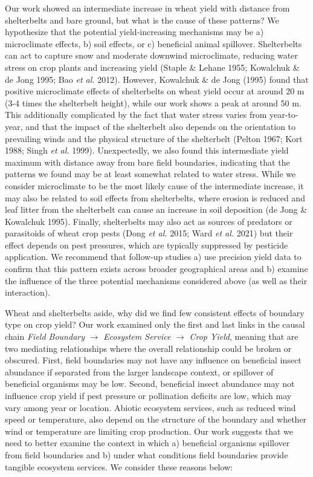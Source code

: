 \documentclass[]{elsarticle} %
\begin{document}
Our work showed an intermediate increase in wheat yield with distance from shelterbelts and bare ground, but what is the cause of these patterns?
We hypothesize that the potential yield-increasing mechanisms may be a) microclimate effects, b) soil effects, or c) beneficial animal spillover.
Shelterbelts can act to capture snow and moderate downwind microclimate, reducing water stress on crop plants and increasing yield (Staple \& Lehane 1955; Kowalchuk \& de Jong 1995; Bao \emph{et al.} 2012).
However, Kowalchuk \& de Jong (1995) found that positive microclimate effects of shelterbelts on wheat yield occur at around 20 m (3-4 times the shelterbelt height), while our work shows a peak at around 50 m.
This additionally complicated by the fact that water stress varies from year-to-year, and that the impact of the shelterbelt also depends on the orientation to prevailing winds and the physical structure of the shelterbelt (Pelton 1967; Kort 1988; Singh \emph{et al.} 1999).
Unexpectedly, we also found this intermediate yield maximum with distance away from bare field boundaries, indicating that the patterns we found may be at least somewhat related to water stress.
While we consider microclimate to be the most likely cause of the intermediate increase, it may also be related to soil effects from shelterbelts, where erosion is reduced and leaf litter from the shelterbelt can cause an increase in soil deposition (de Jong \& Kowalchuk 1995).
Finally, shelterbelts may also act as sources of predators or parasitoids of wheat crop pests (Dong \emph{et al.} 2015; Ward \emph{et al.} 2021) but their effect depends on pest pressures, which are typically suppressed by pesticide application.
We recommend that follow-up studies a) use precision yield data to confirm that this pattern exists across broader geographical areas and b) examine the influence of the three potential mechanisms considered above (as well as their interaction).

Wheat and shelterbelts aside, why did we find few consistent effects of boundary type on crop yield?
Our work examined only the first and last links in the causal chain \emph{Field Boundary} \(\rightarrow\) \emph{Ecosystem Service} \(\rightarrow\) \emph{Crop Yield}, meaning that are two mediating relationships where the overall relationship could be broken or obscured.
First, field boundaries may not have any influence on beneficial insect abundance if separated from the larger landscape context, or spillover of beneficial organisms may be low.
Second, beneficial insect abundance may not influence crop yield if pest pressure or pollination deficits are low, which may vary among year or location.
Abiotic ecosystem services, such as reduced wind speed or temperature, also depend on the structure of the boundary and whether wind or temperature are limiting crop production.
Our work suggests that we need to better examine the context in which a) beneficial organisms spillover from field boundaries and b) under what conditions field boundaries provide tangible ecosystem services.
We consider these reasons below:
\end{document}
